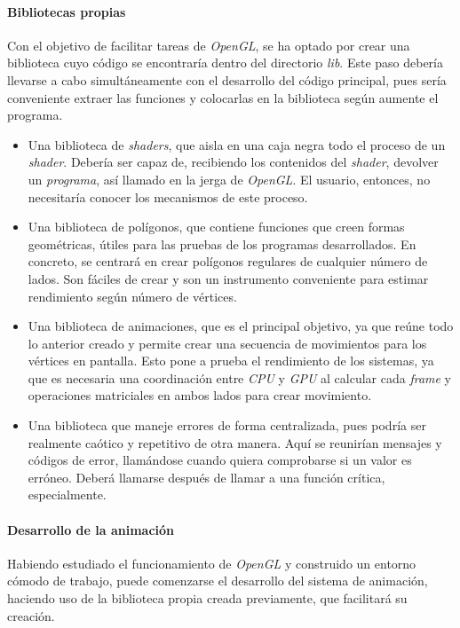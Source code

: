 \paragraph{Bibliotecas propias}
Con el objetivo de facilitar tareas de \textit{OpenGL}, se ha optado por crear una biblioteca cuyo código se encontraría dentro del directorio \textit{lib}. Este paso debería llevarse a cabo simultáneamente con el desarrollo del código principal, pues sería conveniente extraer las funciones y colocarlas en la biblioteca según aumente el programa.

\begin{itemize}
    \item Una biblioteca de \textit{shaders}, que aisla en una caja negra todo el proceso de un \textit{shader}. Debería ser capaz de, recibiendo los contenidos del \textit{shader}, devolver un \textit{programa}, así llamado en la jerga de \textit{OpenGL}. El usuario, entonces, no necesitaría conocer los mecanismos de este proceso.

    \item Una biblioteca de polígonos, que contiene funciones que creen formas geométricas, útiles para las pruebas de los programas desarrollados. En concreto, se centrará en crear polígonos regulares de cualquier número de lados. Son fáciles de crear y son un instrumento conveniente para estimar rendimiento según número de vértices.

    \item Una biblioteca de animaciones, que es el principal objetivo, ya que reúne todo lo anterior creado y permite crear una secuencia de movimientos para los vértices en pantalla. Esto pone a prueba el rendimiento de los sistemas, ya que es necesaria una coordinación entre \textit{CPU} y \textit{GPU} al calcular cada \textit{frame} y operaciones matriciales en ambos lados para crear movimiento.

    \item Una biblioteca que maneje errores de forma centralizada, pues podría ser realmente caótico y repetitivo de otra manera. Aquí se reunirían mensajes y códigos de error, llamándose cuando quiera comprobarse si un valor es erróneo. Deberá llamarse después de llamar a una función crítica, especialmente.
\end{itemize}


\paragraph{Desarrollo de la animación}
Habiendo estudiado el funcionamiento de \textit{OpenGL} y construido un entorno cómodo de trabajo, puede comenzarse el desarrollo del sistema de animación, haciendo uso de la biblioteca propia creada previamente, que facilitará su creación.

